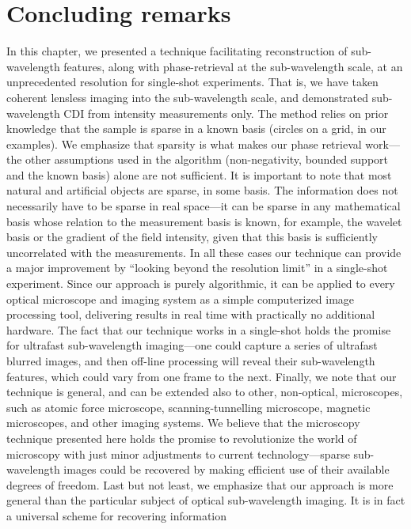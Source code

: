\section{Concluding remarks}
\label{sec:sparse-concluding-remarks}
In this chapter, we presented a technique facilitating reconstruction
of sub-wavelength features, along with phase-retrieval at the
sub-wavelength scale, at an unprecedented resolution for single-shot
experiments. That is, we have taken coherent lensless imaging into the
sub-wavelength scale, and demonstrated sub-wavelength CDI from
intensity measurements only. The method relies on prior knowledge
that the sample is sparse in a known basis (circles on a grid, in our
examples). We emphasize that sparsity is what makes our
phase retrieval work---the other assumptions used in the algorithm
(non-negativity, bounded support and the known basis) alone are not
sufficient. It is important to note that most natural and artificial
objects are sparse, in some basis. The information does not
necessarily have to be sparse in real space---it can be sparse in any
mathematical basis whose relation to the measurement basis is known,
for example, the wavelet basis or the gradient of the field intensity, given
that this basis is sufficiently uncorrelated with the measurements. In
all these cases our technique can provide a major improvement by
``looking beyond the resolution limit'' in a single-shot
experiment. Since our approach is purely algorithmic, it can be
applied to every optical microscope and imaging system as a simple
computerized image processing tool, delivering results in real time
with practically no additional hardware. The fact that our technique
works in a single-shot holds the promise for ultrafast sub-wavelength
imaging---one could capture a series of ultrafast blurred images, and
then off-line processing will reveal their sub-wavelength features,
which could vary from one frame to the next.  Finally, we note that
our technique is general, and can be extended also to other,
non-optical, microscopes, such as atomic force microscope,
scanning-tunnelling microscope, magnetic microscopes, and other
imaging systems. We believe that the microscopy technique presented
here holds the promise to revolutionize the world of microscopy with
just minor adjustments to current technology---sparse sub-wavelength
images could be recovered by making efficient use of their available
degrees of freedom. Last but not least, we emphasize that our approach
is more general than the particular subject of optical sub-wavelength
imaging. It is in fact a universal scheme for recovering information
